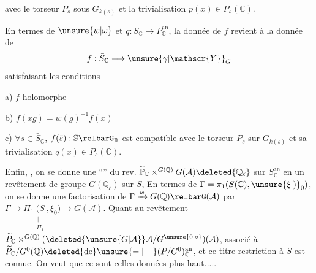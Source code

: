 avec le torseur $P_s$ sous $G_{k(s)}$ et la trivialisation $p(x)\in P_s(\mathbb{C})$.

En termes de $\unsure{w|\omega}$ et $q:\bar S_{\mathbb{C}}\longrightarrow P_{\mathbb{C}}^{\mathrm{an}}$, la donnée de $f$ revient à la donnée de
\[
f:\bar S_{\mathbb{C}}\longrightarrow\unsure{\gamma|\mathscr{Y}}_G
\]
satisfaisant les conditions

a) $f$ holomorphe

b) $f(xg)=w(g)^{-1}f(x)$

c)  $\forall\bar s\in\bar S_{\mathbb{C}}$,  $f(\bar s):\mathbb{S}\relbarG_{\mathbb{R}}$ est compatible avec le torseur $P_s$ sur $G_{k(s)}$ et sa trivialisation $q(x)\in P_s(\mathbb{C})$.

Enfin, , on se donne une ``'' du rev. $\widetilde{\mathbb P}_{\mathbb{C}}\mathbin{\times}^{G(\mathbb{Q})}G(\mathcal A)\deleted{\mathbb{Q}_{\ell}}$ sur $S_{\mathbb{C}}^{\mathrm{an}}$ en un revêtement
 de groupe $G(\mathbb{Q}_{\ell})$ sur $S$, En termes  de $\Gamma=\pi_1(S(\mathbb{C}),\unsure{\xi|\mathord{)}}_0)$, on se donne une factorisation de $\Gamma\xrightarrow{w}G(\mathbb{Q})\relbarG(\mathcal A)$ par $\Gamma\longrightarrow\Pi_1\underset{\substack{\Vert\\\Pi_1}}{(S},\xi_0)\longrightarrow G(\mathcal A)$. Quant au revêtement $\widetilde P_{\mathbb{C}}\mathbin{\times}^{G(\mathbb{Q})}(\deleted{\unsure{G|\mathcal A}}\mathcal A/G^{\unsure{0|\circ}})(\mathcal A)$,  associé à $\widetilde P_{\mathbb{C}}/G^0(\mathbb{Q})\deleted{\text{de}}\unsure{=|\relbar}(P/G^0)_{\mathbb{C}}^{\mathrm{an}}$, et  ce titre  restriction à $S$  est connue. On veut que ce sont celles données plus haut.....



